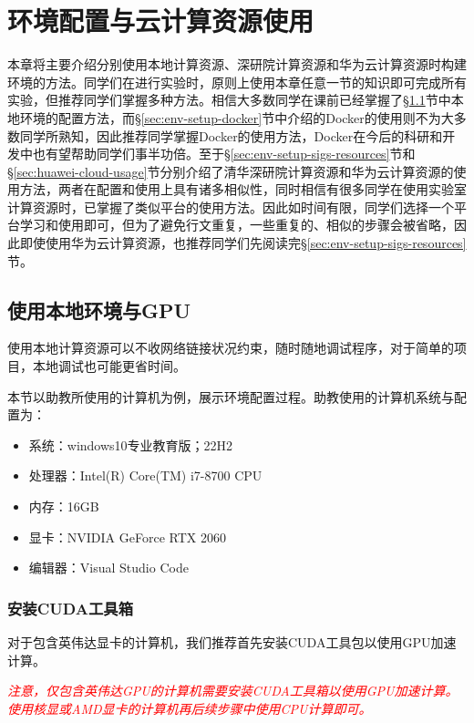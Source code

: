 \chapter{环境配置与云计算资源使用}

本章将主要介绍分别使用本地计算资源、深研院计算资源和华为云计算资源时构建环境的方法。同学们在进行实验时，原则上使用本章任意一节的知识即可完成所有实验，但推荐同学们掌握多种方法。相信大多数同学在课前已经掌握了\S\ref{sec:local-env}节中本地环境的配置方法，而\S\ref{sec:env-setup-docker}节中介绍的Docker的使用则不为大多数同学所熟知，因此推荐同学掌握Docker的使用方法，Docker在今后的科研和开发中也有望帮助同学们事半功倍。至于\S\ref{sec:env-setup-sigs-resources}节和\S\ref{sec:huawei-cloud-usage}节分别介绍了清华深研院计算资源和华为云计算资源的使用方法，两者在配置和使用上具有诸多相似性，同时相信有很多同学在使用实验室计算资源时，已掌握了类似平台的使用方法。因此如时间有限，同学们选择一个平台学习和使用即可，但为了避免行文重复，一些重复的、相似的步骤会被省略，因此即使使用华为云计算资源，也推荐同学们先阅读完\S\ref{sec:env-setup-sigs-resources}节。

\section{使用本地环境与GPU}\label{sec:local-env}

使用本地计算资源可以不收网络链接状况约束，随时随地调试程序，对于简单的项目，本地调试也可能更省时间。

本节以助教所使用的计算机为例，展示环境配置过程。助教使用的计算机系统与配置为：
\begin{itemize}
    \item 系统：windows10专业教育版；22H2
    \item 处理器：Intel(R) Core(TM) i7-8700 CPU 
    \item 内存：16GB
    \item 显卡：NVIDIA GeForce RTX 2060
    \item 编辑器：Visual Studio Code
\end{itemize}

\subsection{安装CUDA工具箱}

对于包含英伟达显卡的计算机，我们推荐首先安装CUDA工具包以使用GPU加速计算。

\textcolor{red}{\emph{注意，仅包含英伟达GPU的计算机需要安装CUDA工具箱以使用GPU加速计算。使用核显或AMD显卡的计算机再后续步骤中使用CPU计算即可。}}

